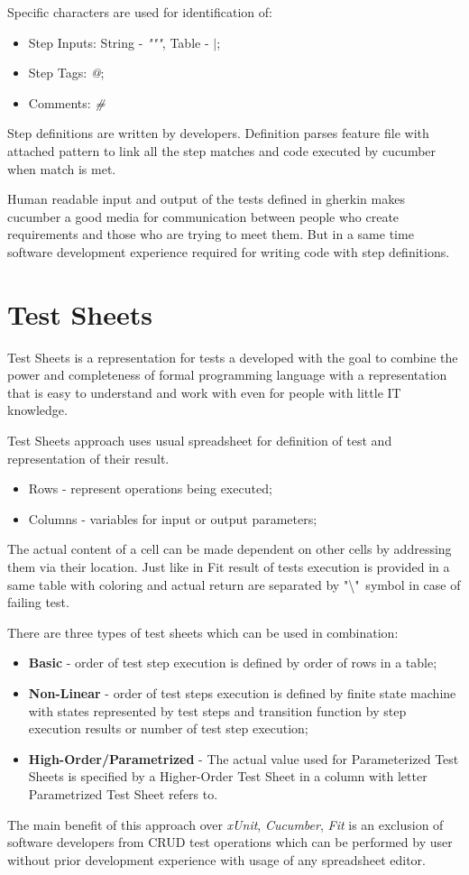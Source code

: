 Specific characters are used for identification of:
\begin{itemize}
	\item Step Inputs: String - \textit{"""}, Table - \textit{$|$};
	\item Step Tags: \textit{@};
	\item Comments: \textit{\#}
\end{itemize}

Step definitions are written by developers. Definition parses feature file with attached pattern to link all the step matches and code executed by cucumber when match is met.

Human readable input and output of the tests defined in gherkin makes cucumber a good media for communication between people who create requirements and those who are trying to meet them. But in a same time software development experience required for writing code with step definitions.

\section{Test Sheets}
Test Sheets is a representation for tests a developed with the goal to combine the power and completeness of formal programming language with a representation that is easy to understand and work with even for people with little IT knowledge\cite{ts}.

Test Sheets approach uses usual spreadsheet for definition of test and representation of their result. 
\begin{itemize}
	\item Rows - represent operations being executed;
	\item Columns -  variables for input or output parameters;
\end{itemize}

The actual content of a cell can be made dependent on other cells by addressing them via their location.
Just like in Fit result of tests execution is provided in a same table with coloring and actual return are separated by "\textbackslash"\ symbol in case of failing test\cite{tsb}.

There are three types of test sheets which can be used in combination:
\begin{itemize}
	\item \textbf{Basic} - order of test step execution is defined by order of rows in a table;
	\item \textbf{Non-Linear} - order of test steps execution is defined by finite state machine with states represented by test steps and transition function by step execution results or number of test step execution;
	\item \textbf{High-Order/Parametrized} - The actual value used for Parameterized Test Sheets is specified by a Higher-Order Test Sheet in a column with letter Parametrized Test Sheet refers to.
\end{itemize}
The main benefit of this approach over \textit{xUnit}, \textit{Cucumber}, \textit{Fit} is an exclusion of software developers from CRUD test operations which can be performed by user without prior development experience with usage of any spreadsheet editor.

